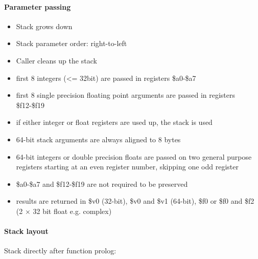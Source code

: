 \paragraph{Parameter passing}

\begin{itemize}
\item Stack grows down
\item Stack parameter order: right-to-left
\item Caller cleans up the stack
\item first 8 integers (<= 32bit) are passed in registers \$a0-\$a7
\item first 8 single precision floating point arguments are passed in registers \$f12-\$f19
\item if either integer or float registers are used up, the stack is used
\item 64-bit stack arguments are always aligned to 8 bytes
\item 64-bit integers or double precision floats are passed on two general purpose registers starting at an even register number, skipping one odd register
\item \$a0-\$a7 and \$f12-\$f19 are not required to be preserved
\item results are returned in \$v0 (32-bit), \$v0 and \$v1 (64-bit), \$f0 or \$f0 and \$f2 (2 $\times$ 32 bit float e.g. complex)
\end{itemize}

\paragraph{Stack layout}

Stack directly after function prolog:\\

